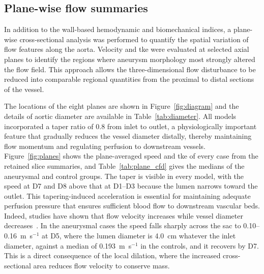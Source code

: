 \documentclass[12pt,a4paper]{article}
\newcommand{\TKE}{\ac{tke}\xspace}
\theoremstyle{definition}
\numberwithin{equation}{section}
\begin{document}


\FloatBarrier

\subsection{Plane-wise flow summaries}
\label{sec:planes}

In addition to the wall-based hemodynamic and biomechanical indices, a plane-wise cross-sectional analysis was performed to quantify the spatial variation of flow features along the aorta. Velocity and \TKE were evaluated at selected axial planes to identify the regions where aneurysm morphology most strongly altered the flow field. This approach allows the three-dimensional flow disturbance to be reduced into comparable regional quantities from the proximal to distal sections of the vessel.

The locations of the eight planes are shown in Figure~\ref{fig:diagram} and the details of aortic diameter are available in Table~\ref{tab:diameter}. All models incorporated a taper ratio of 0.8 from inlet to outlet, a physiologically important feature that gradually reduces the vessel diameter distally, thereby maintaining flow momentum and regulating perfusion to downstream vessels. Figure~\ref{fig:planes} shows the plane-averaged speed and \TKE of every case from the retained slice summaries, and Table~\ref{tab:plane_cfd} gives the medians of the aneurysmal and control groups. The taper is visible in every model, with the speed at D7 and D8 above that at D1--D3 because the lumen narrows toward the outlet. This tapering-induced acceleration is essential for maintaining adequate perfusion pressure that ensures sufficient blood flow to downstream vascular beds. Indeed, studies have shown that flow velocity increases while vessel diameter decreases~\cite{kahveci2015numerical}. In the aneurysmal cases the speed falls sharply across the sac to 0.10--0.16~m~s$^{-1}$ at D5, where the lumen diameter is 4.0~cm whatever the inlet diameter, against a median of 0.193~m~s$^{-1}$ in the controls, and it recovers by D7. This is a direct consequence of the local dilation, where the increased cross-sectional area reduces flow velocity to conserve mass.
\end{document}
